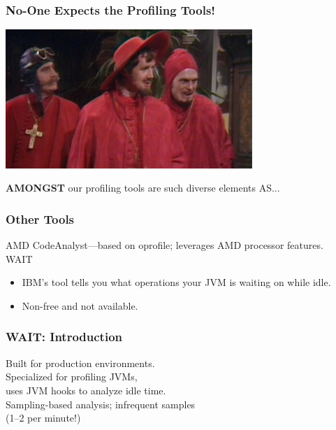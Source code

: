 \begin{frame}
\frametitle{No-One Expects the Profiling Tools!}

\begin{center}
	\includegraphics[width=0.7\textwidth]{images/spanishinquisition.jpg}
\end{center}

\textbf{AMONGST} our profiling tools are such diverse elements AS...

\end{frame}


\begin{frame}[fragile]
  \frametitle{Other Tools}


\begin{changemargin}{1.5cm}

    AMD CodeAnalyst---based on oprofile; leverages AMD processor features.\\[1em]

    WAIT\\[0em]
      \begin{itemize}
        \item IBM's tool tells you what operations your JVM is waiting on while
          idle.
        \item Non-free and not available.
      \end{itemize}
      \end{changemargin}
\end{frame}

\begin{frame}
  \frametitle{WAIT: Introduction}


\begin{changemargin}{1.5cm}

Built for production environments.\\[1em]

Specialized for profiling JVMs, \\uses JVM hooks to analyze idle time.\\[1em]

Sampling-based analysis; infrequent samples\\ (1--2 per minute!)
\end{changemargin}
\end{frame}

